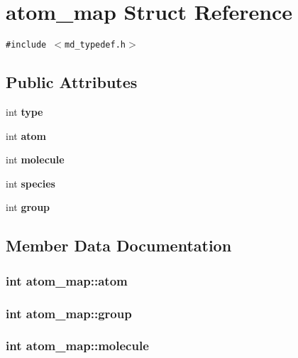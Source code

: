 \section{atom\_\-map Struct Reference}
\label{structatom__map}
{\tt \#include $<$md\_\-typedef.h$>$}

\subsection*{Public Attributes}
\begin{CompactItemize}
\item 
int {\bf type}
\item 
int {\bf atom}
\item 
int {\bf molecule}
\item 
int {\bf species}
\item 
int {\bf group}
\end{CompactItemize}


\subsection{Member Data Documentation}
\subsubsection{\setlength{\rightskip}{0pt plus 5cm}int {\bf atom\_\-map::atom}}\label{structatom__map_d4d37ee64305a172a758908716199751}


\subsubsection{\setlength{\rightskip}{0pt plus 5cm}int {\bf atom\_\-map::group}}\label{structatom__map_8f90fee1c9b84d953cb1fdb26106aa54}


\subsubsection{\setlength{\rightskip}{0pt plus 5cm}int {\bf atom\_\-map::molecule}}\label{structatom__map_cf7882be27e02f72b66bfc383fe6c9ca}


